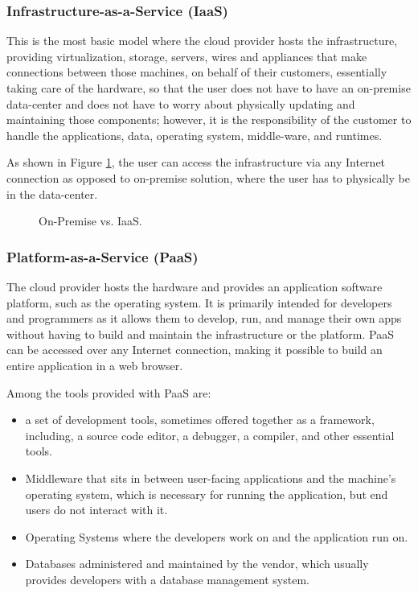 \subsubsection{Infrastructure-as-a-Service (IaaS)}
This is the most basic model where the cloud provider hosts the infrastructure, providing virtualization, storage, servers, wires and appliances that make connections between those machines, on behalf of their customers, essentially taking care of the hardware, so that the user does not have to have an on-premise data-center and does not have to worry about physically updating and maintaining those components; however, it is the responsibility of the customer to handle the applications, data, operating system, middle-ware, and runtimes. 

As shown in Figure \ref{fig:iaas}, the user can access the infrastructure via any Internet connection as opposed to on-premise solution, where the user has to physically be in the data-center.

\begin{figure}[!htb]
    \centering
    
    \caption{On-Premise vs. IaaS. \cite{iaas}}
    \label{fig:iaas}
\end{figure}


\subsubsection{Platform-as-a-Service (PaaS)}
The cloud provider hosts the hardware and provides an application software platform, such as the operating system. It is primarily intended for developers and programmers as it allows them to develop, run, and manage their own apps without having to build and maintain the infrastructure or the platform. PaaS can be accessed over any Internet connection, making it possible to build an entire application in a web browser. 

Among the tools provided with PaaS are: 
\begin{itemize}
    \item a set of development tools, sometimes offered together as a framework, including, a source code editor, a debugger, a compiler, and other essential tools. 
    \item Middleware that sits in between user-facing applications and the machine's operating system, which is necessary for running the application, but end users do not interact with it.
    \item Operating Systems where the developers work on and the application run on.
    \item Databases administered and maintained by the vendor, which usually provides developers with a database management system.
\end{itemize}

